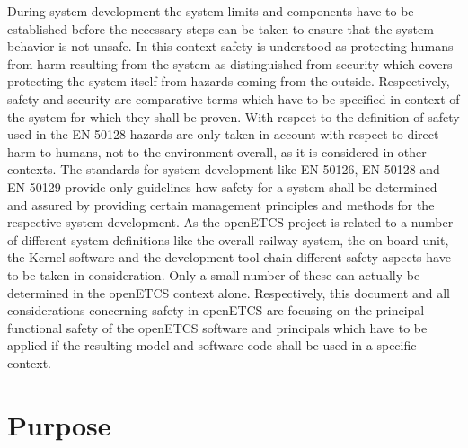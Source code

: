 \documentclass{template/openetcs_report}
\begin{document}
During system development the system limits and components have to be established before the necessary steps can be taken to ensure that the system behavior is not unsafe. In this context safety is understood as protecting humans from harm resulting from the system as distinguished from security which covers protecting the system itself from hazards coming from the outside. Respectively, safety and security are comparative terms which have to be specified in context of the system for which they shall be proven. With respect to the definition of safety used in the EN 50128 hazards are only taken in account with respect to direct harm to humans, not to the environment overall, as it is considered in other contexts. The standards for system development like EN 50126, EN 50128 and EN 50129 provide only guidelines how safety for a system shall be determined and assured by providing certain management principles and methods for the respective system development. As the openETCS project is related to a number of different system definitions like the overall railway system, the on-board unit, the Kernel software and the development tool chain different safety aspects have to be taken in consideration. Only a small number of these can actually be determined in the openETCS context alone. Respectively, this document and all considerations concerning safety in openETCS are focusing on the principal functional safety of the openETCS software and principals which have to be applied if the resulting model and software code shall be used in a specific context.

\section{Purpose}
\label{sec:purpose}
\end{document}
